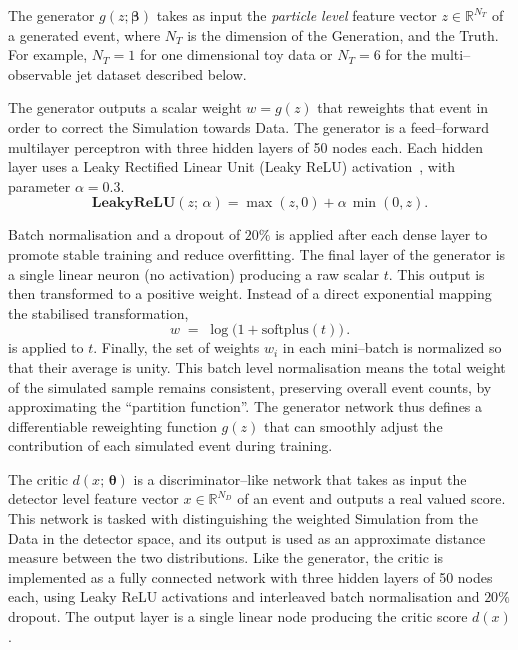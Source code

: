 {{        The generator $g(z;\boldsymbol{\beta})$ takes as input the \emph{particle level} feature vector $z \in \mathbb{R}^{N_T}$ of a generated event, where \(N_T\) is the dimension of the Generation, and the Truth.
        For example, $N_T=1$ for one dimensional toy data or $N_T=6$ for the multi--observable jet dataset described below.
        
        The generator outputs a scalar weight $w=g(z)$ that reweights that event in order to correct the Simulation towards Data.
        The generator is a feed--forward multilayer perceptron with three hidden layers of 50 nodes each.
        Each hidden layer uses a Leaky Rectified Linear Unit (Leaky ReLU) activation~\cite{Maas2013RectifierModels}, with parameter \(\alpha = 0.3.\)
        \[
            \textbf{LeakyReLU} (z;\,\alpha) = \max(z, 0) + \alpha\,\min(0, z).
        \]
        
        Batch normalisation and a dropout of \(20\%\) is applied after each dense layer to promote stable training and reduce overfitting.
        The final layer of the generator is a single linear neuron (no activation) producing a raw scalar $t$.
        This output is then transformed to a positive weight.
        Instead of a direct exponential mapping the stabilised transformation,
        \[ 
            w \;=\; \log\Big(1 + \text{softplus}(t)\Big)\,.
        \]
        is applied to \(t\).
         Finally, the set of weights ${w_i}$ in each mini--batch is normalized so that their average is unity.
         This batch level normalisation means the total weight of the simulated sample remains consistent, preserving overall event counts, by approximating the ``partition function''.
         The generator network thus defines a differentiable reweighting function $g(z)$ that can smoothly adjust the contribution of each simulated event during training.

        The critic $d(x;\,\boldsymbol{\theta})$ is a discriminator--like network that takes as input the detector level feature vector $x \in \mathbb{R}^{N_D}$ of an event and outputs a real valued score.
        This network is tasked with distinguishing the weighted Simulation from the Data in the detector space, and its output is used as an approximate distance measure between the two distributions.
        Like the generator, the critic is implemented as a fully connected network with three hidden layers of 50 nodes each, using Leaky ReLU activations and interleaved batch normalisation and \(20\%\) dropout.
        The output layer is a single linear node producing the critic score $d(x)$.
        
}}
